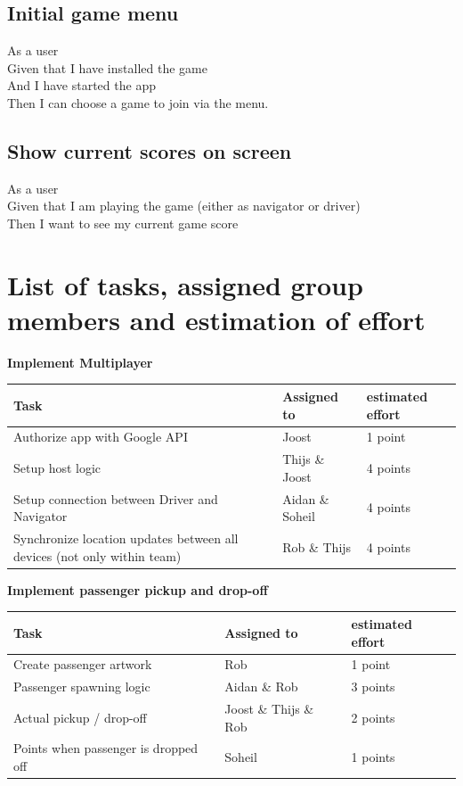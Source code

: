 \documentclass{article}
\begin{document}
\subsection*{Initial game menu}
As a user\\
Given that I have installed the game\\
And I have started the app\\
Then I can choose a game to join via the menu.
\subsection*{Show current scores on screen}
As a user\\
Given that I am playing the game (either as navigator or driver)\\
Then I want to see my current game score
\section*{List of tasks, assigned group members and estimation of effort}
\textbf{Implement Multiplayer} \\
\begin{tabular}{ | l | l | l | }
\hline
\textbf{Task} & \textbf{Assigned to} & \textbf{estimated effort} \\ \hline
Authorize app with Google API & Joost & 1 point\\ \hline
Setup host logic & Thijs \& Joost & 4 points\\ \hline
Setup connection between Driver and Navigator & Aidan \& Soheil & 4 points \\ \hline
Synchronize location updates between all devices (not only within team) & Rob \& Thijs & 4 points \\ \hline
\end{tabular} \newline
\newline
\textbf{Implement passenger pickup and drop-off} \\
\begin{tabular}{ | l | l | l | }
\hline
\textbf{Task} & \textbf{Assigned to} & \textbf{estimated effort} \\ \hline
Create passenger artwork & Rob & 1 point\\ \hline
Passenger spawning logic & Aidan \& Rob & 3 points\\ \hline
Actual pickup / drop-off & Joost \& Thijs \& Rob& 2 points\\ \hline
Points when passenger is dropped off & Soheil & 1 points\\ \hline
\end{tabular}
\end{document}
